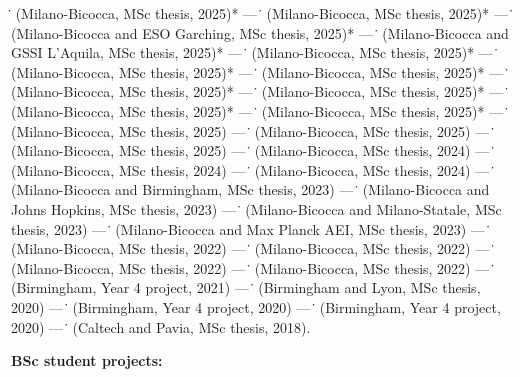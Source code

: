 \textit{\. } (Milano-Bicocca, MSc thesis, 2025)* --- 
\textit{\. } (Milano-Bicocca, MSc thesis, 2025)* --- 
\textit{\. } (Milano-Bicocca and ESO Garching, MSc thesis, 2025)* --- 
\textit{\. } (Milano-Bicocca and GSSI L'Aquila, MSc thesis, 2025)* --- 
\textit{\. } (Milano-Bicocca, MSc thesis, 2025)* --- 
\textit{\. } (Milano-Bicocca, MSc thesis, 2025)* --- 
\textit{\. } (Milano-Bicocca, MSc thesis, 2025)* --- 
\textit{\. } (Milano-Bicocca, MSc thesis, 2025)* --- 
\textit{\. } (Milano-Bicocca, MSc thesis, 2025)* --- 
\textit{\. } (Milano-Bicocca, MSc thesis, 2025)* --- 
\textit{\. } (Milano-Bicocca, MSc thesis, 2025)* --- 
\textit{\. } (Milano-Bicocca, MSc thesis, 2025) --- 
\textit{\. } (Milano-Bicocca, MSc thesis, 2025) --- 
\textit{\. } (Milano-Bicocca, MSc thesis, 2025) --- 
\textit{\. } (Milano-Bicocca, MSc thesis, 2024) --- 
\textit{\. } (Milano-Bicocca, MSc thesis, 2024) --- 
\textit{\. } (Milano-Bicocca, MSc thesis, 2024) --- 
\textit{\. } (Milano-Bicocca and Birmingham, MSc thesis, 2023) --- 
\textit{\. } (Milano-Bicocca and Johns Hopkins, MSc thesis, 2023) --- 
\textit{\. } (Milano-Bicocca and Milano-Statale, MSc thesis, 2023) --- 
\textit{\. } (Milano-Bicocca and Max Planck AEI, MSc thesis, 2023) --- 
\textit{\. } (Milano-Bicocca, MSc thesis, 2022) --- 
\textit{\. } (Milano-Bicocca, MSc thesis, 2022) --- 
\textit{\. } (Milano-Bicocca, MSc thesis, 2022) --- 
\textit{\. } (Milano-Bicocca, MSc thesis, 2022) --- 
\textit{\. } (Birmingham, Year 4 project, 2021) --- 
\textit{\. } (Birmingham and Lyon, MSc thesis, 2020) --- 
\textit{\. } (Birmingham, Year 4 project, 2020) --- 
\textit{\. } (Birmingham, Year 4 project, 2020) --- 
\textit{\. } (Caltech and Pavia, MSc thesis, 2018).

\vspace{0.2cm}
\textbf{BSc student projects:}

